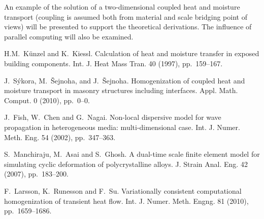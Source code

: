 An example of the solution of a two-dimensional coupled heat and moisture transport (coupling is assumed both from material and scale bridging point of views) will be presented to support the theoretical derivations. The influence of parallel computing will also be examined.


\begin{thebibliography}{10}
{\sc H.M.~K\"{u}nzel and  K.~Kiessl}. {Calculation of heat and moisture transfer in exposed building components}. Int. J. Heat Mass Tran. 40 (1997), pp.~159--167.

{\sc J.~S\'{y}kora,  M.~\v{S}ejnoha, and J.~\v{S}ejnoha}. {Homogenization of coupled heat and moisture transport in masonry structures including interfaces}. Appl. Math. Comput. 0 (2010), pp.~0--0.

{\sc J.~Fish, W.~Chen and G.~Nagai}. {Non-local dispersive model for wave propagation in heterogeneous media: multi-dimensional case}. Int. J. Numer. Meth. Eng. 54 (2002), pp.~347--363.

{\sc S.~Manchiraju, M.~Asai and S.~Ghosh}. {A dual-time scale finite element model for simulating cyclic deformation of polycrystalline alloys}. J. Strain Anal. Eng. 42 (2007), pp.~183--200.

{\sc F.~Larsson, K.~Runesson and F.~Su}. {Variationally consistent computational homogenization of transient heat flow}. Int. J. Numer. Meth. Engng. 81 (2010), pp.~1659--1686.
\end{thebibliography}